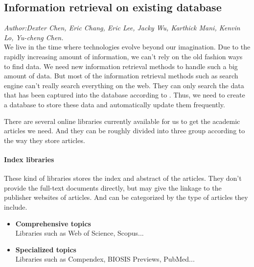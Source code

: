 	
\subsection{Information retrieval on existing database}
\textit{\footnotesize Author:Dexter Chen, Eric Chang, Eric Lee, Jacky Wu, Karthick Mani, Kenvin Lo, Yu-cheng Chen.}\\

We live in the time where technologies evolve beyond our imagination. Due to the rapidly increasing amount of information, we can't rely on the old fashion ways to find data. We need new information retrieval methods to handle such a big amount of data. But most of the information retrieval methods such as search engine can't really search everything on the web. They can only search the data that has been captured into the database according to \cite{Grehan2002}. Thus, we need to create a database to store these data and automatically update them frequently.

There are several online libraries currently available for us to get the academic articles we need. And they can be roughly divided into three group according to the way they store articles.

\paragraph{Index libraries}
	These kind of libraries stores the index and abstract of the articles. They don't provide the full-text documents directly, but may give the linkage to the publisher websites of articles. And can be categorized by the type of articles they include.
	\begin{itemize}
		\item\textbf{Comprehensive topics}\\Libraries such as Web of Science, Scopus...
		\item\textbf{Specialized topics}\\Libraries such as Compendex, BIOSIS Previews, PubMed...
	\end{itemize}
	
